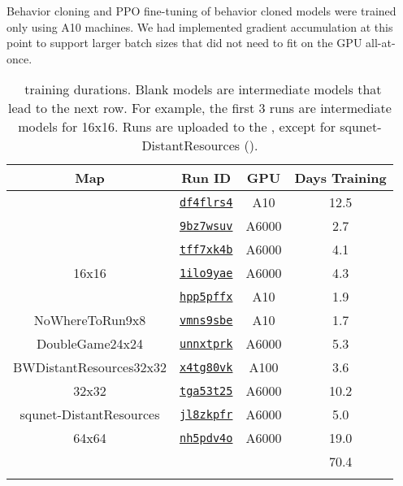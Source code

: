 \documentclass[conference]{IEEEtran}
\newcounter{supptable}
\newenvironment{supptable}
  {\renewcommand{\tablename}{Supplemental Table}\setcounter{table}{\value{supptable}}\addtocounter{supptable}{1}\begin{table}}
  {\end{table}\setcounter{supptable}{\value{table}}}
\begin{document}
Behavior cloning and PPO fine-tuning of behavior cloned models were trained only using
A10 machines. We had implemented gradient accumulation at this point to support larger
batch sizes that did not need to fit on the GPU all-at-once.

\label{appendix:training-durations}
\begin{supptable}[H]
    \caption{\agentName\ training durations. Blank models are intermediate models that
    lead to the next row. For example, the first 3 runs are intermediate models for
    16x16. Runs are uploaded to the \wbProject, except
    for squnet-DistantResources (\microRTSWBProjectPath).}
    \label{tab:training-durations}
    \begin{center}
    \begin{tabular}{lccc}
        \multicolumn{1}{c}{Map} & Run ID & GPU & Days Training \\
        \midrule
         & \href{https://wandb.ai/\wbProjectPath/runs/df4flrs4}{\texttt{df4flrs4}} & A10 & 12.5 \\
         & \href{https://wandb.ai/\wbProjectPath/runs/9bz7wsuv}{\texttt{9bz7wsuv}} & A6000 & 2.7 \\
         & \href{https://wandb.ai/\wbProjectPath/runs/tff7xk4b}{\texttt{tff7xk4b}} & A6000 & 4.1 \\
        \multicolumn{1}{c}{16x16} & \href{https://wandb.ai/\wbProjectPath/runs/1ilo9yae}{\texttt{1ilo9yae}} & A6000 & 4.3 \\
         \hline
         & \href{https://wandb.ai/\wbProjectPath/runs/hpp5pffx}{\texttt{hpp5pffx}} & A10 & 1.9 \\
        \multicolumn{1}{c}{NoWhereToRun9x8} & \href{https://wandb.ai/\wbProjectPath/runs/vmns9sbe}{\texttt{vmns9sbe}} & A10 & 1.7 \\
         \hline
        \multicolumn{1}{c}{DoubleGame24x24} & \href{https://wandb.ai/\wbProjectPath/runs/unnxtprk}{\texttt{unnxtprk}} & A6000 & 5.3 \\
         \hline
        \multicolumn{1}{c}{BWDistantResources32x32} & \href{https://wandb.ai/\wbProjectPath/runs/x4tg80vk}{\texttt{x4tg80vk}} & A100 & 3.6 \\
         \hline
        \multicolumn{1}{c}{32x32} & \href{https://wandb.ai/\wbProjectPath/runs/tga53t25}{\texttt{tga53t25}} & A6000 & 10.2 \\
        \multicolumn{1}{c}{squnet-DistantResources} & \href{https://wandb.ai/\microRTSWBProjectPath/runs/jl8zkpfr}{\texttt{jl8zkpfr}} & A6000 & 5.0 \\
         \hline
        \multicolumn{1}{c}{64x64} & \href{https://wandb.ai/\wbProjectPath/runs/nh5pdv4o}{\texttt{nh5pdv4o}} & A6000 & 19.0 \\
        \hline
         & \multicolumn{1}{l}{} & \multicolumn{1}{l}{} & 70.4 \\
         & \multicolumn{1}{l}{} & \multicolumn{1}{l}{} & \multicolumn{1}{l}{}
    \end{tabular}
    \end{center}
\end{supptable}
\end{document}
